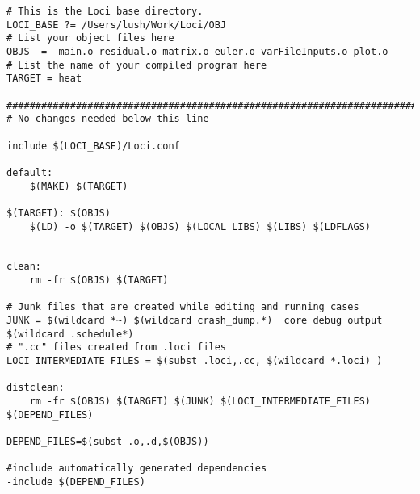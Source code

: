 \begin{verbatim}
# This is the Loci base directory.
LOCI_BASE ?= /Users/lush/Work/Loci/OBJ
# List your object files here
OBJS  =  main.o residual.o matrix.o euler.o varFileInputs.o plot.o 
# List the name of your compiled program here
TARGET = heat

#############################################################################
# No changes needed below this line

include $(LOCI_BASE)/Loci.conf

default:
	$(MAKE) $(TARGET)

$(TARGET): $(OBJS)
	$(LD) -o $(TARGET) $(OBJS) $(LOCAL_LIBS) $(LIBS) $(LDFLAGS)


clean:
	rm -fr $(OBJS) $(TARGET) 

# Junk files that are created while editing and running cases
JUNK = $(wildcard *~) $(wildcard crash_dump.*)  core debug output $(wildcard .schedule*)
# ".cc" files created from .loci files
LOCI_INTERMEDIATE_FILES = $(subst .loci,.cc, $(wildcard *.loci) )

distclean:
	rm -fr $(OBJS) $(TARGET) $(JUNK) $(LOCI_INTERMEDIATE_FILES) $(DEPEND_FILES) 

DEPEND_FILES=$(subst .o,.d,$(OBJS))

#include automatically generated dependencies
-include $(DEPEND_FILES)
\end{verbatim}
